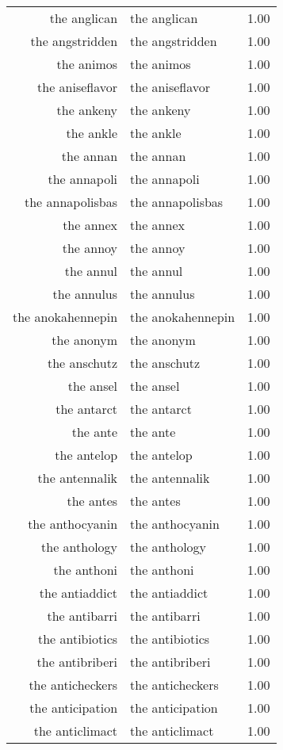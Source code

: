 \begin{table}[ht]
\begin{tabular}{rlr}
  the anglican & the anglican & 1.00 \\ 
  the angstridden & the angstridden & 1.00 \\ 
  the animos & the animos & 1.00 \\ 
  the aniseflavor & the aniseflavor & 1.00 \\ 
  the ankeny & the ankeny & 1.00 \\ 
  the ankle & the ankle & 1.00 \\ 
  the annan & the annan & 1.00 \\ 
  the annapoli & the annapoli & 1.00 \\ 
  the annapolisbas & the annapolisbas & 1.00 \\ 
  the annex & the annex & 1.00 \\ 
  the annoy & the annoy & 1.00 \\ 
  the annul & the annul & 1.00 \\ 
  the annulus & the annulus & 1.00 \\ 
  the anokahennepin & the anokahennepin & 1.00 \\ 
  the anonym & the anonym & 1.00 \\ 
  the anschutz & the anschutz & 1.00 \\ 
  the ansel & the ansel & 1.00 \\ 
  the antarct & the antarct & 1.00 \\ 
  the ante & the ante & 1.00 \\ 
  the antelop & the antelop & 1.00 \\ 
  the antennalik & the antennalik & 1.00 \\ 
  the antes & the antes & 1.00 \\ 
  the anthocyanin & the anthocyanin & 1.00 \\ 
  the anthology & the anthology & 1.00 \\ 
  the anthoni & the anthoni & 1.00 \\ 
  the antiaddict & the antiaddict & 1.00 \\ 
  the antibarri & the antibarri & 1.00 \\ 
  the antibiotics & the antibiotics & 1.00 \\ 
  the antibriberi & the antibriberi & 1.00 \\ 
  the anticheckers & the anticheckers & 1.00 \\ 
  the anticipation & the anticipation & 1.00 \\ 
  the anticlimact & the anticlimact & 1.00 \\ 

\end{tabular}
\end{table}
